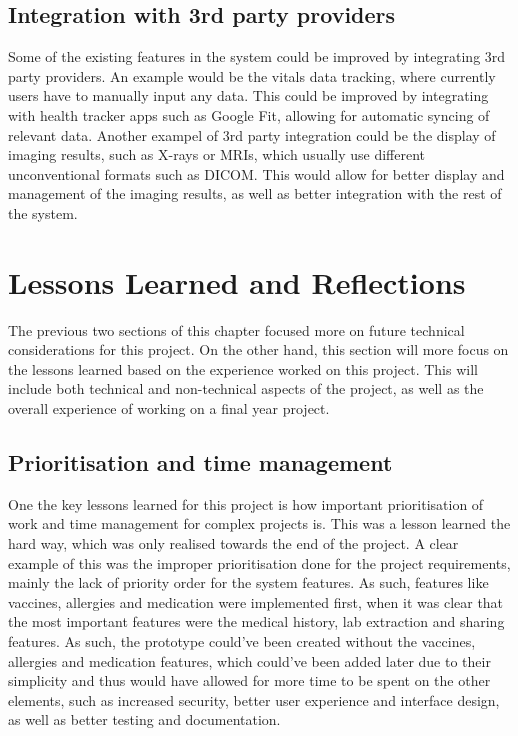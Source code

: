 \subsection{Integration with 3rd party providers}

Some of the existing features in the system could be improved by integrating 3rd party providers. An example would be the vitals data tracking, where currently users have to manually input any data. This could be improved by integrating with health tracker apps such as Google Fit, allowing for automatic syncing of relevant data. Another exampel of 3rd party integration could be the display of imaging results, such as X-rays or MRIs, which usually use different unconventional formats such as DICOM\@. This would allow for better display and management of the imaging results, as well as better integration with the rest of the system.

\section{Lessons Learned and Reflections}

The previous two sections of this chapter focused more on future technical considerations for this project. On the other hand, this section will more focus on the lessons learned based on the experience worked on this project. This will include both technical and non-technical aspects of the project, as well as the overall experience of working on a final year project.

\subsection{Prioritisation and time management}

One the key lessons learned for this project is how important prioritisation of work and time management for complex projects is. This was a lesson learned the hard way, which was only realised towards the end of the project. A clear example of this was the improper prioritisation done for the project requirements, mainly the lack of priority order for the system features. As such, features like vaccines, allergies and medication were implemented first, when it was clear that the most important features were the medical history, lab extraction and sharing features. As such, the prototype could've been created without the vaccines, allergies and medication features, which could've been added later due to their simplicity and thus would have allowed for more time to be spent on the other elements, such as increased security, better user experience and interface design, as well as better testing and documentation.

